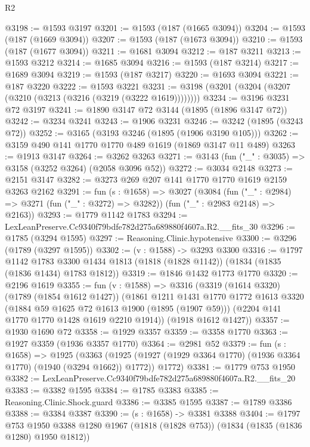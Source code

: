 \begin{lexlean}{R2}
\begin{coremodule}
@3198 := @1593 @3197
@3201 := @1593 (@187 (@1665 @3094))
@3204 := @1593 (@187 (@1669 @3094))
@3207 := @1593 (@187 (@1673 @3094))
@3210 := @1593 (@187 (@1677 @3094))
@3211 := @1681 @3094
@3212 := @187 @3211
@3213 := @1593 @3212
@3214 := @1685 @3094
@3216 := @1593 (@187 @3214)
@3217 := @1689 @3094
@3219 := @1593 (@187 @3217)
@3220 := @1693 @3094
@3221 := @187 @3220
@3222 := @1593 @3221
@3231 := @3198 (@3201 (@3204 (@3207 (@3210 (@3213 (@3216 (@3219 (@3222 @1619))))))))
@3234 := @3196 @3231 @72 @3197
@3241 := @1890 @3147 @72 @3144 (@1895 (@1896 @3147 @72))
@3242 := @3234 @3241
@3243 := @1906 @3231
@3246 := @3242 (@1895 (@3243 @72))
@3252 := @3165 (@3193 @3246 (@1895 (@1906 @3190 @105)))
@3262 := @3159 @490 @141 @1770 @1770 @489 @1619 (@1869 @3147 @11 @489)
@3263 := @1913 @3147
@3264 := @3262 @3263
@3271 := @3143 (fun ("_" : @3035) => @3158 (@3252 @3264) (@2058 @3096 @52))
@3272 := @3034 @2148
@3273 := @2151 @3147
@3282 := @3273 @269 @207 @141 @1770 @1770 @1619 @2159 @3263 @2162
@3291 := fun (s : @1658) =>
  @3027
    (@3084
      (fun ("_" : @2984) => @3271 (fun ("_" : @3272) => @3282))
      (fun ("_" : @2983 @2148) => @2163))
@3293 := @1779 @1142 @1783
@3294 := LexLeanPreserve.Cc9340f79bdfe782d275a689880f4607a.R2.__fits_30
@3296 := @1785 (@3294 @1595)
@3297 := Reasoning.Clinic.hypotensive
@3300 := @3296 (@1789 (@3297 @1595))
@3302 := (v : @1588) -> @3293 @3300
@3316 := @1797
    @1142
    @1783
    @3300
    @1434
    @1813
    (@1818 (@1828 @1142))
    (@1834 (@1835 (@1836 @1434) @1783 @1812))
@3319 := @1846 @1432 @1773 @1770
@3320 := @2196 @1619
@3355 := fun (v : @1588) =>
  @3316
    (@3319
      (@1614 @3320)
      (@1789 (@1854 @1612 @1427))
      (@1861
        @1211
        @1431
        @1770
        @1772
        @1613
        @3320
        (@1884 @59 @1625 @72 @1613 @1900 (@1895 (@1907 @59)))
        (@2204 @141 @1770 @1770 @1428 @1619 @2210 @1914))
      (@1918 @1612 @1427))
@3357 := @1930 @1690 @72
@3358 := @1929 @3357
@3359 := @3358 @1770
@3363 := @1927 @3359 (@1936 @3357 @1770)
@3364 := @2981 @52
@3379 := fun (s : @1658) =>
  @1925
    (@3363
      (@1925 (@1927 (@1929 @3364 @1770) (@1936 @3364 @1770) (@1940 (@3294 @1662)) @1772))
      @1772)
@3381 := @1779 @753 @1950
@3382 := LexLeanPreserve.Cc9340f79bdfe782d275a689880f4607a.R2.__fits_20
@3383 := @3382 @1595
@3384 := @1785 @3383
@3385 := Reasoning.Clinic.Shock.guard
@3386 := @3385 @1595
@3387 := @1789 @3386
@3388 := @3384 @3387
@3390 := (s : @1658) -> @3381 @3388
@3404 := @1797
    @753
    @1950
    @3388
    @1280
    @1967
    (@1818 (@1828 @753))
    (@1834 (@1835 (@1836 @1280) @1950 @1812))

\end{coremodule}
\end{lexlean}
